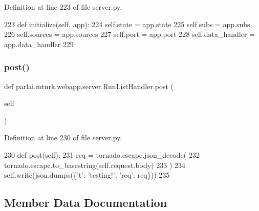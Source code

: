 Definition at line 223 of file server.\+py.


\begin{DoxyCode}
223     \textcolor{keyword}{def }initialize(self, app):
224         self.state = app.state
225         self.subs = app.subs
226         self.sources = app.sources
227         self.port = app.port
228         self.data\_handler = app.data\_handler
229 
\end{DoxyCode}
\mbox{\label{classparlai_1_1mturk_1_1webapp_1_1server_1_1RunListHandler_a7ecee21fd9a47687af7466e502bba574}} 
\subsubsection{\texorpdfstring{post()}{post()}}
{\footnotesize\ttfamily def parlai.\+mturk.\+webapp.\+server.\+Run\+List\+Handler.\+post (\begin{DoxyParamCaption}\item[{}]{self }\end{DoxyParamCaption})}



Definition at line 230 of file server.\+py.


\begin{DoxyCode}
230     \textcolor{keyword}{def }post(self):
231         req = tornado.escape.json\_decode(
232             tornado.escape.to\_basestring(self.request.body)
233         )
234         self.write(json.dumps(\{\textcolor{stringliteral}{'t'}: \textcolor{stringliteral}{'testing!'}, \textcolor{stringliteral}{'req'}: req\}))
235 
\end{DoxyCode}


\subsection{Member Data Documentation}
\mbox{\label{classparlai_1_1mturk_1_1webapp_1_1server_1_1RunListHandler_a5084daae3aa6f6de486452498adbc2a1}} 
